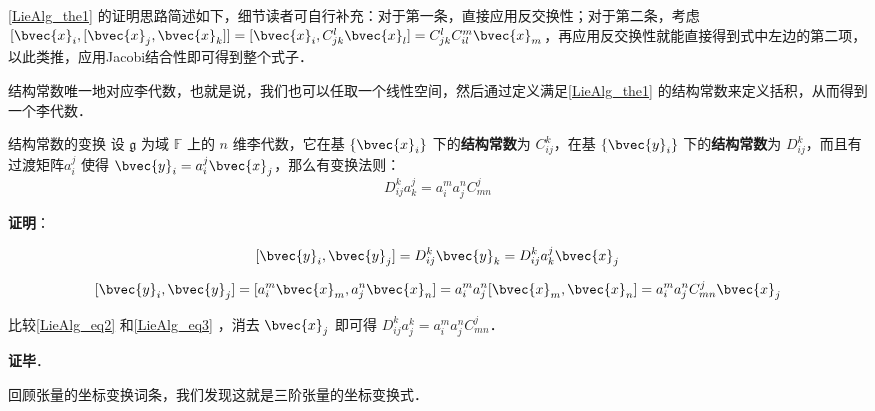 \autoref{LieAlg_the1} 的证明思路简述如下，细节读者可自行补充：对于第一条，直接应用反交换性；对于第二条，考虑 $[\bvec{x}_i, [\bvec{x}_j, \bvec{x}_k]] = [\bvec{x}_i, C_{jk}^l \bvec{x}_l] = C_{jk}^l C_{il}^m \bvec{x}_m$，再应用反交换性就能直接得到式中左边的第二项，以此类推，应用Jacobi结合性即可得到整个式子．

结构常数唯一地对应李代数，也就是说，我们也可以任取一个线性空间，然后通过定义满足\autoref{LieAlg_the1} 的结构常数来定义括积，从而得到一个李代数．

\begin{theorem}{结构常数的变换}
设 $\mathfrak{g}$ 为域 $\mathbb{F}$ 上的 $n$ 维李代数，它在基 $\{\bvec{x}_i\}$ 下的\textbf{结构常数}为 $C^k_{ij}$，在基 $\{\bvec{y}_i\}$ 下的\textbf{结构常数}为 $D^k_{ij}$，而且有过渡矩阵$a_i^j$ 使得 $\bvec{y}_i=a_i^j\bvec{x}_j$，那么有变换法则：
\begin{equation}
D_{ij}^k a_k^j=a_i^m a_j^n C^j_{mn}
\end{equation}

\end{theorem}

\textbf{证明}：

\begin{equation}\label{LieAlg_eq2}
[\bvec{y}_i, \bvec{y}_j] = D_{ij}^k \bvec{y}_k = D_{ij}^k a_k^j \bvec{x}_j
\end{equation}

\begin{equation}\label{LieAlg_eq3}
[\bvec{y}_i, \bvec{y}_j]=[a_i^m \bvec{x}_m, a_j^n \bvec{x}_n]=a_i^m a_j^n[\bvec{x}_m, \bvec{x}_n]=a_i^m a_j^n C^j_{mn} \bvec{x}_j
\end{equation}

比较\autoref{LieAlg_eq2} 和\autoref{LieAlg_eq3} ，消去 $\bvec{x}_j$ 即可得 $D_{ij}^k a^k_j = a_i^m a_j^n C^j_{mn}$．

\textbf{证毕}．

回顾张量的坐标变换词条，我们发现这就是三阶张量的坐标变换式．






